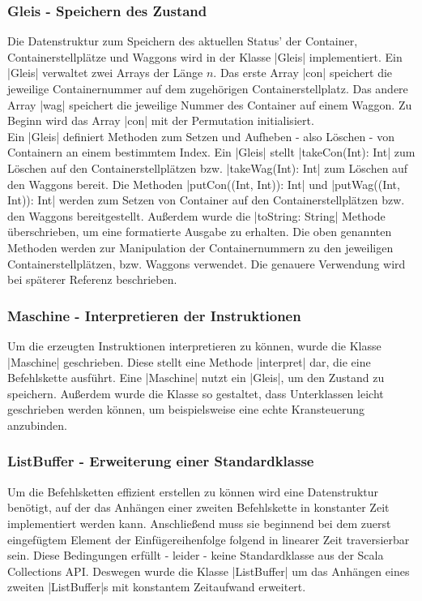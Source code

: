 \subsubsection{Gleis - Speichern des Zustand}
\label{gleis}
Die Datenstruktur zum Speichern des aktuellen Status' der Container, Containerstellplätze und Waggons wird in der Klasse |Gleis| implementiert.
Ein |Gleis| verwaltet zwei Arrays der Länge $n$. Das erste Array |con| speichert die jeweilige Containernummer auf dem zugehörigen Containerstellplatz.
Das andere Array |wag| speichert die jeweilige Nummer des Container auf einem Waggon.
Zu Beginn wird das Array |con| mit der Permutation initialisiert. \\
Ein |Gleis| definiert Methoden zum Setzen und Aufheben - also Löschen - von Containern an einem bestimmtem Index.
Ein |Gleis| stellt |takeCon(Int): Int| zum Löschen auf den Containerstellplätzen bzw. |takeWag(Int): Int| zum Löschen auf den Waggons bereit.
Die Methoden |putCon((Int, Int)): Int| und |putWag((Int, Int)): Int| werden zum Setzen von Container auf den Containerstellplätzen bzw. den Waggons bereitgestellt.
Außerdem wurde die |toString: String| Methode über\-schrie\-ben, um eine formatierte Ausgabe zu erhalten.
Die oben genannten Methoden werden zur Manipulation der Containernummern zu den jeweiligen Containerstellplätzen, bzw. Waggons verwendet.
Die genauere Verwendung wird bei späterer Referenz beschrieben.

\subsubsection{Maschine - Interpretieren der Instruktionen}
Um die erzeugten Instruktionen interpretieren zu können, wurde die Klasse |Maschine| geschrieben.
Diese stellt eine Methode |interpret| dar, die eine Befehlskette ausführt.
Eine |Maschine| nutzt ein |Gleis|, um den Zustand zu speichern.
Außerdem wurde die Klasse so gestaltet, dass Unterklassen leicht geschrieben werden können, um beispielsweise eine echte Kransteuerung anzubinden.

\subsubsection{ListBuffer - Erweiterung einer Standardklasse}
Um die Befehlsketten effizient erstellen zu können wird eine Datenstruktur benötigt,
auf der das Anhängen einer zweiten Befehlskette in konstanter Zeit implementiert werden kann.
Anschließend muss sie beginnend bei dem zuerst eingefügtem Element der Einfügereihenfolge folgend in linearer Zeit traversierbar sein.
Diese Bedingungen erfüllt - leider - keine Standardklasse aus der Scala Collections API.
Deswegen wurde die Klasse |ListBuffer| um das Anhängen eines zweiten |ListBuffer|s mit konstantem Zeitaufwand erweitert.

